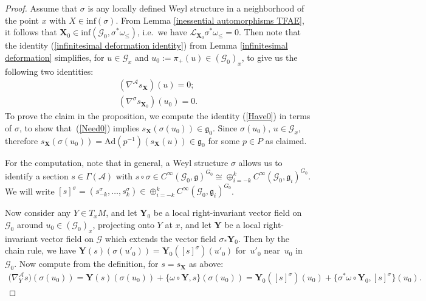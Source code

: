 \documentclass[pdftex]{sigma}
\def\g{\mathfrak{g}}
\def\Abdle{\mathcal{A}}
\def\Gbdle{\mathcal{G}}
\def\Lie{\mathcal{L}}
\def\isom{\cong}
\theoremstyle{plain}
\theoremstyle{definition}
\begin{document}
\begin{proof} Assume that $\sigma$ is any locally def\/ined Weyl structure in a neighborhood of the point $x$ with $X \in \mathrm{inf}(\sigma)$. From Lemma \ref{inessential automorphisms TFAE}, it follows that $\mathbf{X}_0 \in \mathrm{inf}(\Gbdle_0,\sigma^*\omega_{\leq})$, i.e.\ we have $\Lie_{\mathbf{X}_0} \sigma^*\omega_{\leq} = 0$. Then note that the identity (\ref{infinitesimal deformation identity}) from Lemma \ref{infinitesimal deformation} simplif\/ies, for $u \in \Gbdle_x$ and $u_0 := \pi_+(u) \in (\Gbdle_0)_x$, to give us the following two identities:
\begin{gather}
(\nabla^{\Abdle} s_{\mathbf{X}})(u) = 0; \label{Have0} \\
(\nabla^{\sigma} s_{\mathbf{X}_0})(u_0) = 0. \label{Need0}
\end{gather}
 To prove the claim in the proposition, we compute the identity (\ref{Have0}) in terms of $\sigma$, to show that~(\ref{Need0}) implies $s_{\mathbf{X}}(\sigma(u_0)) \in \g_0$. Since $\sigma(u_0)$, $u \in \Gbdle_x$, therefore $s_{\mathbf{X}}(\sigma(u_0)) = \mathrm{Ad}(p^{-1})(s_{\mathbf{X}}(u)) \in \g_0$ for some $p \in P$ as claimed.

 For the computation, note that in general, a Weyl structure $\sigma$ allows us to identify a section $s \in \Gamma(\Abdle)$ with $s \circ \sigma \in C^{\infty}(\Gbdle_0,\g)^{G_0} \isom \oplus_{i=-k}^k C^{\infty}(\Gbdle_0,\g_i)^{G_0}$. We will write $[s]^{\sigma} = (s^{\sigma}_{-k}, \ldots , s^{\sigma}_k) \in \oplus_{i=-k}^k C^{\infty}(\Gbdle_0,\g_i)^{G_0}$.

  Now consider any $Y \in T_xM$, and let $\mathbf{Y}_0$ be a local right-invariant vector f\/ield on $\Gbdle_0$ around $u_0 \in (\Gbdle_0)_x$, projecting onto $Y$ at $x$, and let $\mathbf{Y}$ be a local right-invariant vector f\/ield on $\Gbdle$ which extends the vector f\/ield $\sigma_* \mathbf{Y}_0$. Then by the chain rule, we have $\mathbf{Y}(s)(\sigma(u'_0)) = \mathbf{Y}_0([s]^{\sigma})(u'_0)$ for~$u'_0$ near~$u_0$ in~$\Gbdle_0$. Now compute from the def\/inition, for $s = s_{\mathbf{X}}$ as above:
\begin{gather*}
\big(\nabla^{\Abdle}_Y s\big)(\sigma(u_0))  = \mathbf{Y}(s)(\sigma(u_0)) + \{\omega \circ \mathbf{Y},s\}(\sigma(u_0))
  = \mathbf{Y}_0([s]^{\sigma})(u_0) + \{\sigma^*\omega \circ \mathbf{Y}_0,[s]^{\sigma}\}(u_0).
\end{gather*}


\end{proof}
\end{document}
